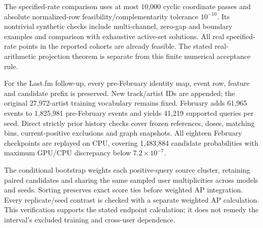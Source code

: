 \begin{appendices}
The specified-rate comparison uses at most 10,000 cyclic coordinate passes and absolute normalized-row feasibility/complementarity tolerance $10^{-10}$. Its nontrivial synthetic checks include multi-channel, zero-gap and boundary examples and comparison with exhaustive active-set solutions. All real specified-rate points in the reported cohorts are already feasible. The stated real-arithmetic projection theorem is separate from this finite numerical acceptance rule.

For the Last.fm follow-up, every pre-February identity map, event row, feature and candidate prefix is preserved. New track/artist IDs are appended; the original 27,972-artist training vocabulary remains fixed. February adds 61,965 events to 1,825,981 pre-February events and yields 41,219 supported queries per seed. Direct strictly prior history checks cover frozen references, doses, matching bins, current-positive exclusions and graph snapshots. All eighteen February checkpoints are replayed on CPU, covering 1,483,884 candidate probabilities with maximum GPU/CPU discrepancy below $7.2\times10^{-7}$.

The conditional bootstrap weights each positive-query source cluster, retaining paired candidates and sharing the same sampled user multiplicities across models and seeds. Sorting preserves exact score ties before weighted AP integration. Every replicate/seed contrast is checked with a separate weighted AP calculation. This verification supports the stated endpoint calculation; it does not remedy the interval's excluded training and cross-user dependence.
\end{appendices}
